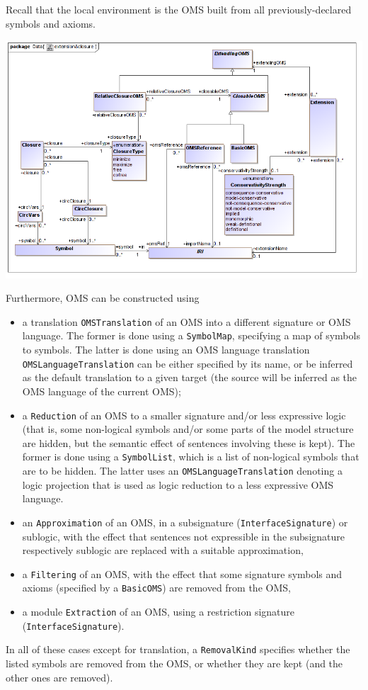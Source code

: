 \documentclass[10pt,fleqn,final]{scrreprt}
\newcommand*{\termref}[1]{\index{#1}#1\xspace}
\newcommand*{\syntax}[1]{\texttt{#1}}
\newenvironment{definitions}[0]{\medskip }{}
\begin{document}
\begin{definitions}
\begin{itemize}
\end{itemize}
Recall that the local environment is the OMS built from all
previously-declared symbols and axioms.
\medskip
\begin{center}
\includegraphics[scale=0.47]{mof/extension&closure.png}
\end{center}

Furthermore, OMS can be constructed using 
\begin{itemize}
\item a translation \syntax{OMSTranslation} of an OMS into a different
  signature or OMS language. The former is done using a \syntax{SymbolMap},
  specifying a map of symbols to symbols. The latter is done using an 
  OMS language
  translation \syntax{OMSLanguageTranslation} can be either specified
  by its name, or be inferred as the \termref{default translation} to
  a given target (the source will be inferred as the OMS language of
  the current OMS);
\item a \syntax{Reduction} of an OMS to a smaller signature and/or
  less expressive logic (that is, some non-logical symbols and/or some
  parts of the model structure are hidden, but the semantic effect of
  sentences involving these is kept). The former is done using a
  \syntax{SymbolList}, which is a list of non-logical symbols that are
  to be hidden. The latter uses an \syntax{OMSLanguageTranslation}
  denoting a logic projection that is used as logic reduction to a
  less expressive OMS language.
\item an \syntax{Approximation} of an OMS, in a subsignature (\syntax{InterfaceSignature}) or sublogic, with the effect that sentences not expressible in the subsignature respectively sublogic are replaced with a suitable approximation,
\item a \syntax{Filtering} of an OMS, with the effect that some signature symbols and axioms (specified by a \syntax{BasicOMS}) are removed from the OMS,
\item a module \syntax{Extraction} of an OMS, using a restriction signature (\syntax{InterfaceSignature}).
\end{itemize}
In all of these cases except for translation, a \syntax{RemovalKind}
specifies whether the listed symbols are removed from the OMS, or
whether they are kept (and the other ones are removed).




\end{definitions}
\end{document}
